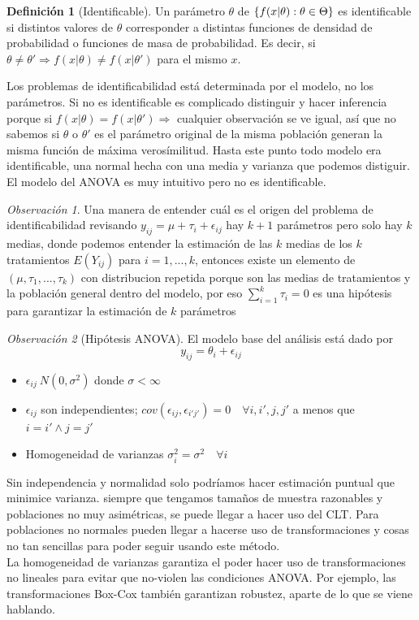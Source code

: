 \documentclass[11pt,a4paper,oneside]{report}
\theoremstyle{definition}
\newtheorem{definicion}{Definición}[chapter]
\theoremstyle{plain}
\theoremstyle{remark}
\newtheorem*{observacion}{Observación}
\DeclarePairedDelimiter{\conj}{\{}{\}}
\begin{document}
  \begin{definicion}[Identificable]
    Un parámetro $\theta$ de $\conj{f(x|\theta): \theta \in \Theta}$ es identificable si distintos valores de $\theta$ corresponder 
    a distintas funciones de densidad de probabilidad o funciones de masa de probabilidad. Es decir, si 
    $\theta \not = \theta '\Rightarrow f(x|\theta)\not = f(x|\theta ')$ para el mismo $x$.
  \end{definicion}
Los problemas de identificabilidad está determinada por el modelo, no los parámetros. Si no es identificable es complicado distinguir
y hacer inferencia porque si $f(x|\theta)=f(x|\theta ') \Rightarrow$ cualquier observación se ve igual, así que no sabemos si $\theta$
o $\theta '$ es el parámetro original de la misma población generan la misma función de máxima verosímilitud. 
Hasta este punto todo modelo era identificable, una normal hecha con una media y varianza que podemos distiguir. 
El modelo del ANOVA es muy intuitivo pero no es identificable.
\begin{observacion}
  Una manera de entender cuál es el origen del problema de identificabilidad revisando $y_{ij}=\mu + \tau_i + \epsilon_{ij}$ 
  hay $k+1$ parámetros pero solo hay $k$ medias, donde podemos entender la estimación de las $k$ medias de los $k$ tratamientos
  $E(Y_{ij})$ para $i=1,...,k$, entonces existe un elemento de $(\mu, \tau_1, ..., \tau_k)$ con distribucion repetida porque son 
  las medias de tratamientos y la población general dentro del modelo, por eso $\sum_{i=1}^{k} \tau_i=0$ es una hipótesis para garantizar
  la estimación de $k$ parámetros
\end{observacion}

\begin{observacion}[Hipótesis ANOVA]
  El modelo base del análisis está dado por
  \[ y_{ij}=\theta_i + \epsilon_{ij} \]

  \begin{itemize}
    \item $\epsilon_{ij}~ N(0, \sigma^2)$ donde $\sigma < \infty$
    \item $\epsilon_{ij}$ son independientes; $cov(\epsilon_{ij},\epsilon_{i'j'})=0 \quad \forall i, i', j, j'$ a menos que $i=i' \wedge j=j'$
    \item Homogeneidad de varianzas $\sigma_i^2=\sigma^2 \quad \forall i$
  \end{itemize}
\end{observacion}

Sin independencia y normalidad solo podríamos hacer estimación puntual que minimice varianza. siempre
que tengamos tamaños de muestra razonables y poblaciones no muy asimétricas, se puede llegar a hacer uso del 
CLT. Para poblaciones no normales pueden llegar a hacerse uso de transformaciones y cosas no tan sencillas para
poder seguir usando este método.\\
La homogeneidad de varianzas garantiza el poder hacer uso de transformaciones no lineales para evitar 
que no-violen las condiciones ANOVA. Por ejemplo, las transformaciones Box-Cox también garantizan robustez, 
aparte de lo que se viene hablando.
\end{document}
